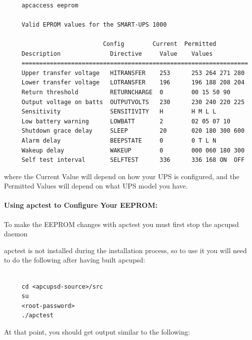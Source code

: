 {{{{{{{{{\footnotesize
\begin{verbatim}
     
     apcaccess eeprom
     
     Valid EPROM values for the SMART-UPS 1000
     
                            Config        Current  Permitted
     Description              Directive     Value    Values
     ================================================================
     Upper transfer voltage   HITRANSFER    253      253 264 271 280
     Lower transfer voltage   LOTRANSFER    196      196 188 208 204
     Return threshold         RETURNCHARGE  0        00 15 50 90
     Output voltage on batts  OUTPUTVOLTS   230      230 240 220 225
     Sensitivity              SENSITIVITY   H        H M L L
     Low battery warning      LOWBATT       2        02 05 07 10
     Shutdown grace delay     SLEEP         20       020 180 300 600
     Alarm delay              BEEPSTATE     0        0 T L N
     Wakeup delay             WAKEUP        0        000 060 180 300
     Self test interval       SELFTEST      336      336 168 ON  OFF
\end{verbatim}
\normalsize

where the Current Value will depend on how your UPS is configured, and the
Permitted Values will depend on what UPS model you have. 

\label{Using-apctest-to-Configure-Your-EEPROM}

\paragraph*{Using apctest to Configure Your EEPROM:}

\label{index-eeprom_002c-apctest-142}
\label{index-apctest-setting-eeprom-143}
To make the EEPROM changes with apctest you must first stop the apcupsd daemon
 

apctest is not installed during the installation process, so to use it you
will need to do the following after having built apcupsd: 

\footnotesize
\begin{verbatim}
     
     cd <apcupsd-source>/src
     su
     <root-password>
     ./apctest
\end{verbatim}
\normalsize

At that point, you should get output similar to the following: 

\footnotesize
\begin{verbatim}
     

\end{verbatim}}}}}}}}}}
